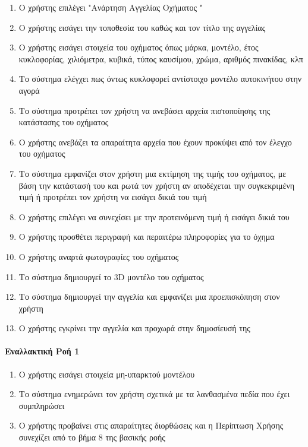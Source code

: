 \documentclass{../ol-softwaremanual}
\begin{document}
	\begin{enumerate}
		
		\item Ο χρήστης επιλέγει \en"\gr Ανάρτηση Αγγελίας Οχήματος \en"\gr 	
		\item Ο χρήστης εισάγει την τοποθεσία του καθώς και τον τίτλο της αγγελίας
		\item Ο χρήστης εισάγει στοιχεία του οχήματος όπως μάρκα, μοντέλο, έτος κυκλοφορίας, χιλιόμετρα, κυβικά, τύπος καυσίμου, χρώμα, αριθμός πινακίδας, κλπ
		\item Το σύστημα ελέγχει πως όντως κυκλοφορεί αντίστοιχο μοντέλο αυτοκινήτου στην αγορά
		\item Το σύστημα προτρέπει τον χρήστη να ανεβάσει αρχεία πιστοποίησης της κατάστασης του οχήματος
		\item Ο χρήστης ανεβάζει τα απαραίτητα αρχεία που έχουν προκύψει από τον έλεγχο του οχήματος		
		\item Το σύστημα εμφανίζει στον χρήστη μια εκτίμηση της τιμής του οχήματος, με βάση την κατάστασή του και ρωτά τον χρήστη αν αποδέχεται την συγκεκριμένη τιμή ή προτρέπει τον χρήστη να εισάγει δικιά του τιμή
		\item Ο χρήστης επιλέγει να συνεχίσει με την προτεινόμενη τιμή ή εισάγει δικιά του
		\item Ο χρήστης προσθέτει περιγραφή και περαιτέρω πληροφορίες για το όχημα
		\item Ο χρήστης αναρτά φωτογραφίες του οχήματος
		\item Το σύστημα δημιουργεί το \en 3D \gr μοντέλο του οχήματος
		\item Το σύστημα δημιουργεί την αγγελία και εμφανίζει μια προεπισκόπηση στον χρήστη
		\item Ο χρήστης εγκρίνει την αγγελία και προχωρά στην δημοσίευσή της		
	\end{enumerate}
	
	\paragraph{Εναλλακτική Ροή 1}
	
	\begin{enumerate}
		\item O χρήστης εισάγει στοιχεία μη-υπαρκτού μοντέλου
		\item Το σύστημα ενημερώνει τον χρήστη σχετικά με τα λανθασμένα πεδία που έχει συμπληρώσει
		\item Ο χρήστης προβαίνει στις απαραίτητες διορθώσεις και η Περίπτωση Χρήσης συνεχίζει από το βήμα 8 της βασικής ροής
	\end{enumerate}
	
\end{document}
